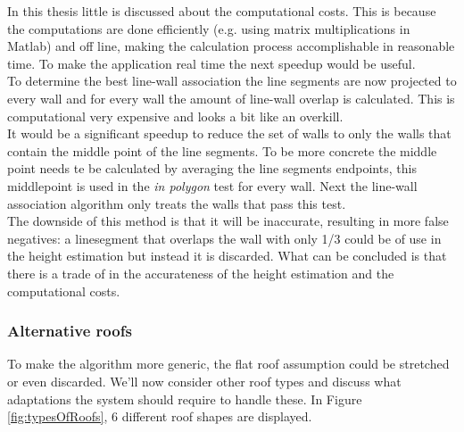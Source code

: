 In this thesis little is discussed about the computational costs. This is
because the computations are done efficiently (e.g. using matrix multiplications
in Matlab) and off line, making the calculation process accomplishable in reasonable time.
To make the application real time the next speedup would be useful.\\
To determine the best line-wall association the line segments are now projected to
every wall and for every wall the amount of line-wall overlap is calculated. This
is computational very expensive and looks a bit like an overkill.\\
It would be a significant speedup to reduce the set of walls to only the walls
that contain the middle point of the line segments. To be more concrete the
middle point needs te be calculated by averaging the line segments endpoints,
this middlepoint is used in the \emph{in polygon} test for every wall.  Next the
line-wall association algorithm only treats the walls that pass this test.\\
The downside of this method is that it will be inaccurate, resulting in more false
negatives: a linesegment that overlaps the wall with only 1/3 could be of
use in the height estimation but instead it is discarded.
What can be concluded is that there is a trade of in the accurateness of the
height estimation and the computational costs.


\subsubsection{Alternative roofs}
To make the algorithm more generic, the flat roof assumption could be stretched
or even discarded.  We'll now consider other roof types and discuss what
adaptations the system should require to handle these.  In Figure
\ref{fig:typesOfRoofs}, 6 different roof shapes are displayed.\\

